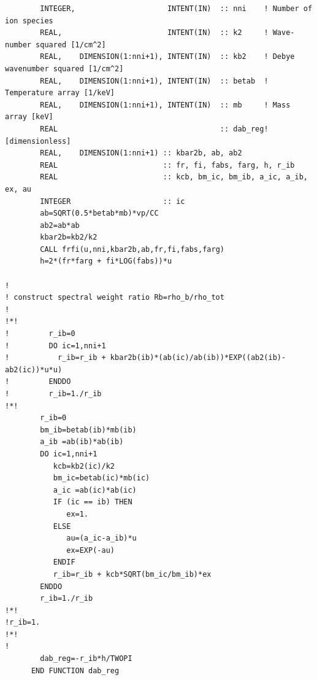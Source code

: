 \documentclass[preprint,12pt,eqsecnum,nofootinbib,amsmath,amssymb]{revtex4}
\begin{document}
{\begin{verbatim}
        INTEGER,                     INTENT(IN)  :: nni    ! Number of ion species
        REAL,                        INTENT(IN)  :: k2     ! Wave-number squared [1/cm^2]
        REAL,    DIMENSION(1:nni+1), INTENT(IN)  :: kb2    ! Debye wavenumber squared [1/cm^2]
        REAL,    DIMENSION(1:nni+1), INTENT(IN)  :: betab  ! Temperature array [1/keV]
        REAL,    DIMENSION(1:nni+1), INTENT(IN)  :: mb     ! Mass array [keV]
        REAL                                     :: dab_reg! [dimensionless]
        REAL,    DIMENSION(1:nni+1) :: kbar2b, ab, ab2
        REAL                        :: fr, fi, fabs, farg, h, r_ib
        REAL                        :: kcb, bm_ic, bm_ib, a_ic, a_ib, ex, au
        INTEGER                     :: ic
        ab=SQRT(0.5*betab*mb)*vp/CC
        ab2=ab*ab
        kbar2b=kb2/k2
        CALL frfi(u,nni,kbar2b,ab,fr,fi,fabs,farg)
        h=2*(fr*farg + fi*LOG(fabs))*u

!
! construct spectral weight ratio Rb=rho_b/rho_tot
!
!*!
!         r_ib=0
!         DO ic=1,nni+1
!           r_ib=r_ib + kbar2b(ib)*(ab(ic)/ab(ib))*EXP((ab2(ib)-ab2(ic))*u*u)
!         ENDDO
!         r_ib=1./r_ib
!*!
        r_ib=0
        bm_ib=betab(ib)*mb(ib)
        a_ib =ab(ib)*ab(ib)
        DO ic=1,nni+1
           kcb=kb2(ic)/k2
           bm_ic=betab(ic)*mb(ic)
           a_ic =ab(ic)*ab(ic)
           IF (ic == ib) THEN
              ex=1.
           ELSE
              au=(a_ic-a_ib)*u
              ex=EXP(-au)
           ENDIF
           r_ib=r_ib + kcb*SQRT(bm_ic/bm_ib)*ex
        ENDDO      
        r_ib=1./r_ib
!*!
!r_ib=1.
!*!
!
        dab_reg=-r_ib*h/TWOPI
      END FUNCTION dab_reg


\end{verbatim}}
\end{document}
